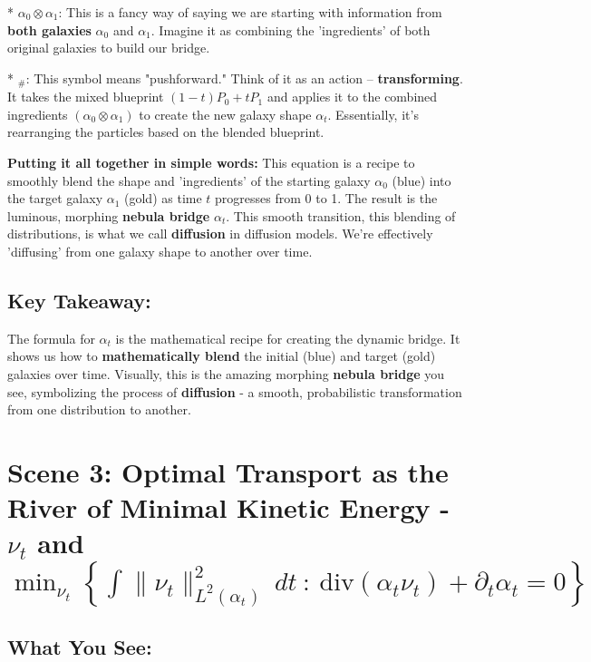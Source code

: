 \documentclass{article}
\begin{document}
*   \textbf{\( \alpha_0 \otimes \alpha_1 \)}:  This is a fancy way of saying we are starting with information from \textbf{both galaxies} \( \alpha_0 \) and \( \alpha_1 \).  Imagine it as combining the 'ingredients' of both original galaxies to build our bridge.

*   \textbf{\( _{\#} \)}: This symbol means "pushforward."  Think of it as an action – \textbf{transforming}.  It takes the mixed blueprint \( (1 - t)P_0 + tP_1 \) and applies it to the combined ingredients \( (\alpha_0 \otimes \alpha_1) \) to create the new galaxy shape \( \alpha_t \).  Essentially, it's rearranging the particles based on the blended blueprint.

\textbf{Putting it all together in simple words:}  This equation is a recipe to smoothly blend the shape and 'ingredients' of the starting galaxy \( \alpha_0 \) (blue) into the target galaxy \( \alpha_1 \) (gold) as time \( t \) progresses from 0 to 1.  The result is the luminous, morphing \textbf{nebula bridge} \( \alpha_t \).  This smooth transition, this blending of distributions, is what we call \textbf{diffusion} in diffusion models. We're effectively 'diffusing' from one galaxy shape to another over time.

\subsection*{Key Takeaway:}

The formula for \( \alpha_t \) is the mathematical recipe for creating the dynamic bridge. It shows us how to \textbf{mathematically blend} the initial (blue) and target (gold) galaxies over time.  Visually, this is the amazing morphing \textbf{nebula bridge} you see, symbolizing the process of \textbf{diffusion} - a smooth, probabilistic transformation from one distribution to another.

\hrulefill

\section*{Scene 3: Optimal Transport as the River of Minimal Kinetic Energy - \( \nu_t \) and \( \min_{\nu_t} \left\{ \int \|\nu_t\|_{L^2(\alpha_t)}^2 \, dt \ : \ \text{div}(\alpha_t \nu_t) + \partial_t \alpha_t = 0 \right\} \)}

\subsection*{What You See:}
\end{document}
